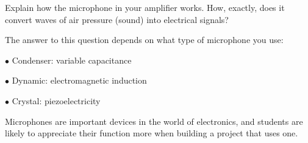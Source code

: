 

Explain how the microphone in your amplifier works.  How, exactly, does it convert waves of air pressure (sound) into electrical signals?







The answer to this question depends on what type of microphone you use:

\medskip
\item{$\bullet$} Condenser: variable capacitance
\item{$\bullet$} Dynamic: electromagnetic induction
\item{$\bullet$} Crystal: piezoelectricity
\medskip







Microphones are important devices in the world of electronics, and students are likely to appreciate their function more when building a project that uses one.




